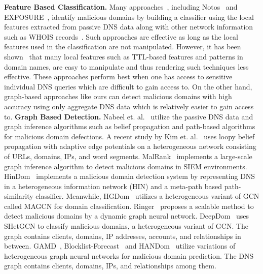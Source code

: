 {\bf Feature Based Classification.}
Many approaches~\cite{maldom:kdd:2009,Fukuda:2015:DNSBackScatter,Segugio_Rahbarinia2015,DeepDGA_Anderson2016,MethodForDetectingDgaBotnet_Tong2016}, including Notos~\cite{Notos_Antonakakis2010} and EXPOSURE~\cite{bilge:2014:Exposure}, identify malicious domains by building a classifier using the local features extracted from passive DNS data along with other network information such as WHOIS records~\cite{Liu:2015:CLP}. Such approaches are effective as long as the local features used in the classification are not manipulated. However, it has been shown~\cite{TowardsSystematicEvaluationOfTheEvadabilityOfBotnetDetectionMethods_Stinson2008} that many local features such as TTL-based features and patterns in domain names, are easy to manipulate and thus rendering such techniques less effective. These approaches perform best when one has access to sensitive individual DNS queries which are difficult to gain access to. On the other hand, graph-based approaches like ours can detect malicious domains with high accuracy using only aggregate DNS data which is relatively easier to gain access to. 
{\bf Graph Based Detection.}
Nabeel et. al.~\cite{bp_mal2:2020} utilize the passive DNS data and graph inference algorithms such as belief propagation and path-based algorithms for malicious domain defections. 
A recent study by Kim et. al.~\cite{BPPhishingCCS:2022} uses loopy belief propagation with adaptive edge potentials on a heterogeneous network consisting of URLs, domains, IPs, and word segments.  
MalRank~\cite{malrank:acsac:2019} implements a large-scale graph inference algorithm to detect malicious domains in SIEM environments. 
HinDom~\cite{hindom:raid:2019} implements a malicious domain detection system by representing DNS in a heterogeneous information network (HIN) and a meta-path based path-similarity classifier.  Meanwhile, HGDom~\cite{hgdom:NOMS:2020} utilizes a heterogeneous variant of GCN called MAGCN for domain classification. Ringer~\cite{ringer:ICCS:2020} proposes a scalable method to detect malicious domains by a dynamic graph neural network. DeepDom~\cite{deepdom:cns:2020} uses SHetGCN to classify malicious domains, a heterogeneous variant of GCN. The graph contains clients, domains, IP addresses, accounts, and relationships in between. GAMD~\cite{ahgnn}, Blocklist-Forecast~\cite{blocklist_raid2024} and HANDom~\cite{handom:wang:2023} utilize variations of heterogeneous graph neural networks for malicious domain prediction. The DNS graph contains clients, domains, IPs, and relationships among them. 

